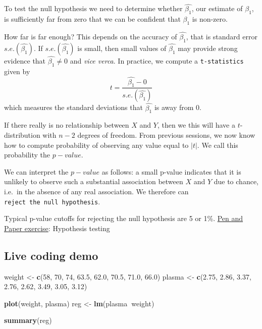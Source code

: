 \documentclass[]{article}
\newenvironment{Shaded}{\begin{snugshade}}{\end{snugshade}}
\newcommand{\DecValTok}[1]{\textcolor[rgb]{0.00,0.00,0.81}{#1}}
\newcommand{\FloatTok}[1]{\textcolor[rgb]{0.00,0.00,0.81}{#1}}
\newcommand{\KeywordTok}[1]{\textcolor[rgb]{0.13,0.29,0.53}{\textbf{#1}}}
\newcommand{\NormalTok}[1]{#1}
\newcommand{\OperatorTok}[1]{\textcolor[rgb]{0.81,0.36,0.00}{\textbf{#1}}}
\newcommand{\StringTok}[1]{\textcolor[rgb]{0.31,0.60,0.02}{#1}}
\begin{document}
To test the null hypothesis we need to determine whether
\(\hat{\beta_1}\), our estimate of \(\beta_1\), is sufficiently far from
zero that we can be confident that \(\beta_1\) is non-zero.

How far is far enough? This depends on the accuracy of
\(\hat{\beta_1}\), that is standard error \(s.e.(\hat{\beta_1})\). If
\(s.e.(\hat{\beta_1})\) is small, then small values of \(\hat{\beta_1}\)
may provide strong evidence that \(\hat{\beta_1}\neq0\) and \emph{vice
verca}. In practice, we compute a \texttt{t-statistics} given by
\[t=\frac{\hat{\beta_1}-0}{s.e.(\hat{\beta_1})}\] which measures the
standard deviations that \(\hat{\beta_1}\) is away from 0.

If there really is no relationship between \(X\) and \(Y\), then we this
will have a \(t\)-distribution with \(n-2\) degrees of freedom. From
previous sessions, we now know how to compute probability of observing
any value equal to \(|t|\). We call this probability the \(p-value\).

We can interpret the \(p-value\) as follows: a small p-value indicates
that it is unlikely to observe such a substantial association between
\(X\) and \(Y\) due to chance, i.e.~in the absence of any real
association. We therefore can \texttt{reject\ the\ null\ hypothesis}.

Typical p-value cutoffs for rejecting the null hypothesis are 5 or 1\%.
\href{pen-and-paper-plasma-volume.pdf}{Pen and Paper exercise}:
Hypothesis testing

\hypertarget{live-coding-demo}{%
\subsection{Live coding demo}\label{live-coding-demo}}

\begin{Shaded}
\begin{Highlighting}[]
\NormalTok{weight <-}\StringTok{ }\KeywordTok{c}\NormalTok{(}\DecValTok{58}\NormalTok{, }\DecValTok{70}\NormalTok{, }\DecValTok{74}\NormalTok{, }\FloatTok{63.5}\NormalTok{, }\FloatTok{62.0}\NormalTok{, }\FloatTok{70.5}\NormalTok{, }\FloatTok{71.0}\NormalTok{, }\FloatTok{66.0}\NormalTok{) }
\NormalTok{plasma <-}\StringTok{ }\KeywordTok{c}\NormalTok{(}\FloatTok{2.75}\NormalTok{, }\FloatTok{2.86}\NormalTok{, }\FloatTok{3.37}\NormalTok{, }\FloatTok{2.76}\NormalTok{, }\FloatTok{2.62}\NormalTok{, }\FloatTok{3.49}\NormalTok{, }\FloatTok{3.05}\NormalTok{, }\FloatTok{3.12}\NormalTok{) }

\KeywordTok{plot}\NormalTok{(weight, plasma)}
\NormalTok{reg <-}\StringTok{ }\KeywordTok{lm}\NormalTok{(plasma}\OperatorTok{~}\NormalTok{weight)}

\KeywordTok{summary}\NormalTok{(reg)}
\end{Highlighting}
\end{Shaded}
\end{document}
